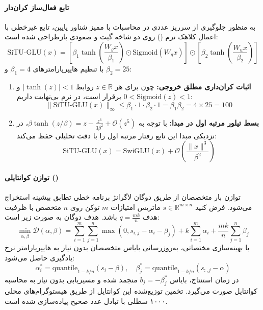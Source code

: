 \paragraph*{تابع فعال‌ساز کران‌دار }
به منظور جلوگیری از سرریز عددی در محاسبات با ممیز شناور پایین، تابع غیرخطی  با اعمال کلاهک نرم () روی دو شاخه گیت و صعودی بازطراحی شده است:
\begin{equation}
    \text{SiTU-GLU}(x) = \left[ \beta_1 \tanh\left(\frac{W_g x}{\beta_1}\right) \odot \text{Sigmoid}(W_g x) \right] \odot \left[ \beta_2 \tanh\left(\frac{W_u x}{\beta_2}\right) \right]
\end{equation}
با تنظیم هایپرپارامترهای $\beta_1 = 4$ و $\beta_2 = 25$:
\begin{enumerate}
    \item \textbf{اثبات کران‌داری مطلق خروجی:}
    چون برای هر $z \in \mathbb{R}$ روابط $|\tanh(z)| < 1$ و $0 < \text{Sigmoid}(z) < 1$ برقرار است، در نرم بی‌نهایت داریم:
    \begin{equation}
        \|\text{SiTU-GLU}(x)\|_\infty \le \beta_1 \cdot 1 \cdot \beta_2 \cdot 1 = \beta_1 \beta_2 = 4 \times 25 = 100
    \end{equation}
    \item \textbf{بسط تیلور مرتبه اول در مبدا:}
    با توجه به $\beta \tanh(z/\beta) = z - \frac{z^3}{3\beta^2} + \mathcal{O}(z^5)$، در نزدیکی مبدا این تابع رفتار مرتبه اول  را با دقت تحلیلی حفظ می‌کند:
    \begin{equation}
        \text{SiTU-GLU}(x) = \text{SwiGLU}(x) + \mathcal{O}\left(\frac{\|x\|^3}{\beta^2}\right)
    \end{equation}
\end{enumerate}

\paragraph*{توازن کوانتایلی ()}
توازن بار متخصصان از طریق دوگان لاگرانژ برنامه خطی تطابق بیشینه استخراج می‌شود. فرض کنید $s \in \mathbb{R}^{m \times n}$ ماتریس امتیازات $m$ توکن روی $n$ متخصص با ظرفیت هدف $q = \frac{mk}{n}$ باشد. هدف دوگان به صورت زیر است:
\begin{equation}
    \min_{\alpha, \beta} \mathcal{D}(\alpha, \beta) = \sum_{i=1}^m \sum_{j=1}^n \max(0, s_{i,j} - \alpha_i - \beta_j) + k \sum_{i=1}^m \alpha_i + \frac{mk}{n} \sum_{j=1}^n \beta_j
\end{equation}
با بهینه‌سازی مختصاتی، به‌روزرسانی بایاس متخصصان بدون نیاز به هایپرپارامتر نرخ یادگیری حاصل می‌شود:
\begin{equation}
    \alpha_i^* = \text{quantile}_{1 - k/n}(s_i - \beta), \quad \beta_j^* = \text{quantile}_{1 - k/n}(s_{:,j} - \alpha)
\end{equation}
در زمان استنتاج، بایاس $b_j = -\beta_j^*$ منجمد شده و مسیریابی بدون نیاز به محاسبه کوانتایل صورت می‌گیرد. تخمین توزیع‌شده این کوانتایل از طریق هیستوگرام‌های محلی ۱۰۰۰ سطلی با تبادل  عدد صحیح پیاده‌سازی شده است.

